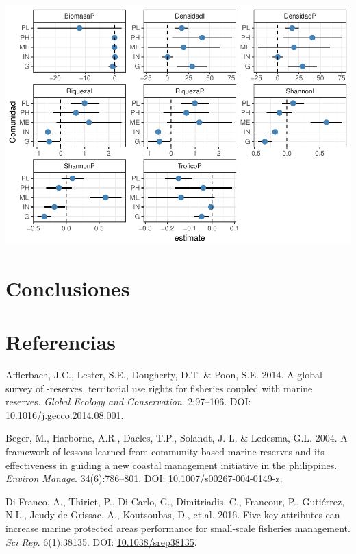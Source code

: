 \documentclass[12pt,]{article}
\begin{document}
\includegraphics{Manuscript_files/figure-latex/unnamed-chunk-12-1.pdf}

\section{Conclusiones}\label{conclusiones}

\section*{Referencias}\label{referencias}

\hypertarget{refs}{}
\hypertarget{ref-afflerbach_2014-HP}{}
Afflerbach, J.C., Lester, S.E., Dougherty, D.T. \& Poon, S.E. 2014. A
global survey of -reserves, territorial use rights for fisheries coupled
with marine reserves. \emph{Global Ecology and Conservation}. 2:97--106.
DOI:
\href{https://doi.org/10.1016/j.gecco.2014.08.001}{10.1016/j.gecco.2014.08.001}.

\hypertarget{ref-beger_2004-Y8}{}
Beger, M., Harborne, A.R., Dacles, T.P., Solandt, J.-L. \& Ledesma, G.L.
2004. A framework of lessons learned from community-based marine
reserves and its effectiveness in guiding a new coastal management
initiative in the philippines. \emph{Environ Manage}. 34(6):786--801.
DOI:
\href{https://doi.org/10.1007/s00267-004-0149-z}{10.1007/s00267-004-0149-z}.

\hypertarget{ref-difranco_2016-Xw}{}
Di Franco, A., Thiriet, P., Di Carlo, G., Dimitriadis, C., Francour, P.,
Gutiérrez, N.L., Jeudy de Grissac, A., Koutsoubas, D., et al. 2016. Five
key attributes can increase marine protected areas performance for
small-scale fisheries management. \emph{Sci Rep}. 6(1):38135. DOI:
\href{https://doi.org/10.1038/srep38135}{10.1038/srep38135}.
\end{document}
